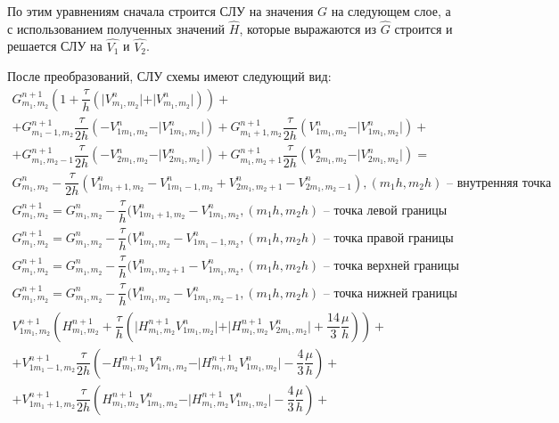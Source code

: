 \documentclass[12pt,a4paper]{article}
\begin{document}
По этим уравнениям сначала строится СЛУ на значения $G$ на следующем слое, а с использованием полученных значений $\hat{H}$,
которые выражаются из $\hat{G}$ строится и решается СЛУ на $\hat{V_1}$ и $\hat{V_2}$.

После преобразований, СЛУ схемы имеют следующий вид:
\begin{gather*}
    G_{m_1, m_2}^{n+1}\left( 1 + \dfrac{\tau}{h}(\vert V_{m_1, m_2}^{n} \vert + \vert V_{m_1, m_2}^{n} \vert) \right) +\\
    + G_{m_1 - 1, m_2}^{n + 1} \dfrac{\tau}{2h} (-V_{1 m_1, m_2}^{n} - \vert V_{1 m_1, m_2}^{n}\vert) + G_{m_1 + 1, m_2}^{n + 1} \dfrac{\tau}{2h} (V_{1 m_1, m_2}^{n} - \vert V_{1 m_1, m_2}^{n}\vert) +\\
    + G_{m_1, m_2 - 1}^{n + 1} \dfrac{\tau}{2h} (-V_{2 m_1, m_2}^{n} - \vert V_{2 m_1, m_2}^{n}\vert) + G_{m_1, m_2 + 1}^{n + 1} \dfrac{\tau}{2h} (V_{2 m_1, m_2}^{n} - \vert V_{2 m_1, m_2}^{n}\vert) =\\
    G_{m_1, m_2}^{n} - \dfrac{\tau}{2h} ( V_{1 m_1 + 1, m_2}^{n} - V_{1 m_1 - 1, m_2}^{n} + V_{2 m_1, m_2 + 1}^{n} - V_{2 m_1, m_2 - 1}^{n} ), (m_1h, m_2h) \text{ -- внутренняя точка}  \\ 
    G_{m_1, m_2}^{n+1} = G_{m_1, m_2}^{n} - \dfrac{\tau}{h} ( V_{1 m_1 + 1, m_2}^{n} - V_{1 m_1, m_2}^{n}, (m_1h, m_2h) \text{ -- точка левой границы}  \\ 
    G_{m_1, m_2}^{n+1} = G_{m_1, m_2}^{n} - \dfrac{\tau}{h} ( V_{1 m_1, m_2}^{n} - V_{1 m_1 - 1, m_2}^{n}, (m_1h, m_2h) \text{ -- точка правой границы}  \\ 
    G_{m_1, m_2}^{n+1} = G_{m_1, m_2}^{n} - \dfrac{\tau}{h} ( V_{1 m_1, m_2 + 1}^{n} - V_{1 m_1, m_2}^{n}, (m_1h, m_2h) \text{ -- точка верхней границы}  \\ 
    G_{m_1, m_2}^{n+1} = G_{m_1, m_2}^{n} - \dfrac{\tau}{h} ( V_{1 m_1, m_2}^{n} - V_{1 m_1, m_2 - 1}^{n}, (m_1h, m_2h) \text{ -- точка нижней границы}  \\ 
    V_{1 m_1, m_2}^{n+1} \left(H_{m_1, m_2}^{n+1} + \dfrac{\tau}{h} \left( \vert H_{m_1, m_2}^{n+1} V_{1 m_1, m_2}^{n} \vert  + \vert H_{m_1, m_2}^{n+1} V_{2 m_1, m_2}^{n} \vert + \dfrac{14}{3} \dfrac{\mu}{h} \right) \right) +\\
    + V_{1 m_1 - 1, m_2}^{n + 1} \dfrac{\tau}{2h} \left(-H_{m_1, m_2}^{n+1}V_{1 m_1, m_2}^{n} - \vert H_{m_1, m_2}^{n+1}V_{1 m_1, m_2}^{n}\vert - \dfrac43 \dfrac{\mu}{h}\right) +\\
    + V_{1 m_1 + 1, m_2}^{n + 1} \dfrac{\tau}{2h} \left(H_{m_1, m_2}^{n+1}V_{1 m_1, m_2}^{n} - \vert H_{m_1, m_2}^{n+1}V_{1 m_1, m_2}^{n}\vert - \dfrac43 \dfrac{\mu}{h}\right) +\\

\end{gather*}
\end{document}
